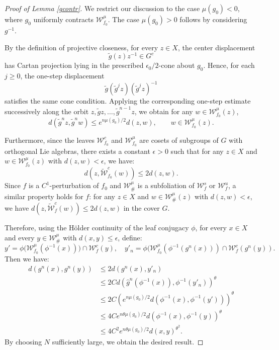 \documentclass[10pt,a4paper]{amsart}
\newcommand{\W}{\mathcal{W}}
\begin{document}
\begin{proof}[Proof of Lemma \ref{gcontr}]


    We restrict our discussion to the case $\mu(g_0) < 0$, where $g_0$ uniformly contracts $\W^\mu_{f_0}$. The case $\mu(g_0) > 0$ follows by considering $g^{-1}$.

By the definition of projective closeness, for every \(z\in X\), the
center displacement
\[
\tilde g(z)z^{-1}\in G^c
\]
has Cartan projection lying in the prescribed \(\epsilon_0/2\)-cone about
\(g_0\). Hence, for each \(j\ge0\), the one-step displacement
\[
\tilde g(\tilde g^j z)(\tilde g^j z)^{-1}
\]
satisfies the same cone condition. Applying the corresponding one-step
estimate successively along the orbit \(z,\tilde g z,\ldots,\tilde g^{n-1}z\),
we obtain for any $w \in \W^\mu_{f_0}(z)$,
\[
d(\tilde g^n z,\tilde g^n w)
   \le e^{n\mu(g_0)/2}d(z,w),
\qquad w\in \W^\mu_{f_0}(z).
\]

    Furthermore, since the leaves $\W^c_{f_0}$ and $\W^\mu_{f_0}$ are cosets of subgroups of $G$ with orthogonal Lie algebras, there exists a constant $\epsilon > 0$ such that for any $z \in X$ and $w \in \W^\mu_{f_0}(z)$ with $d(z,w) < \epsilon$, we have:
    \[
    d(z, \tilde{\W}^c_{f_0}(w)) \le 2d(z,w).
    \]
    Since $f$ is a $C^1$-perturbation of $f_0$ and $\W^\mu_\#$ is a subfoliation of $\W^s_f$ or $\W^u_f$, a similar property holds for $f$: for any $z \in X$ and $w \in \W^\mu_\#(z)$ with $d(z,w) < \epsilon$, we have $d(z, \tilde{\W}^c_f(w)) \le 2d(z,w)$ in the cover $G$.

    Therefore, using the Hölder continuity of the leaf conjugacy $\phi$, for every $x \in X$ and every $y \in \W^\mu_\#$ with $d(x,y) \le \epsilon$, define:
    \[
    y' = \phi\big(\W^\mu_{f_0}(\phi^{-1}(x))\big) \cap \W^c_f(y), \quad y'_n = \phi(\W^\mu_{f_0}(\phi^{-1}(g^n(x))) \cap \W^c_f(g^n(y)).
    \]
    Then we have:
    \[
    \begin{aligned}
    d(g^n(x), g^n(y)) &\le 2 d(g^n(x), y'_n) \\
    &\le 2C d(\hat{g}^n(\phi^{-1}(x)), \phi^{-1}(y'_n))^\theta \\
    &\le 2C \left(e^{n\mu(g_0)/2} d(\phi^{-1}(x), \phi^{-1}(y'))\right)^\theta \\
    &\le 4C e^{n \theta \mu(g_0)/2} d(\phi^{-1}(x), \phi^{-1}(y))^\theta \\
    &\le 4C^2 e^{n \theta \mu(g_0)/2} d(x,y)^{\theta^2}.
    \end{aligned}
    \]
    By choosing $N$ sufficiently large, we obtain the desired result.
\end{proof}
\end{document}
